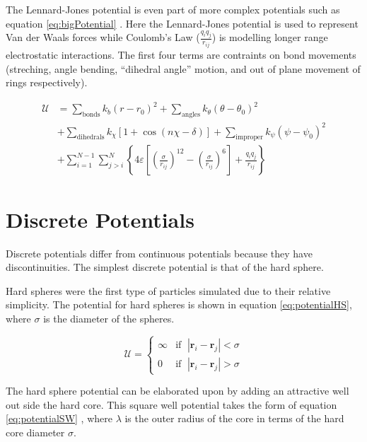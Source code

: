 \message{ !name(main.tex)}\documentclass[12pt]{UoAthesis}
\begin{document}
The Lennard-Jones potential is even part of more complex potentials
such as equation \eqref{eq:bigPotential} \cite{Maginn2010}.  Here the
Lennard-Jones potential is used to represent Van der Waals forces while
Coulomb's Law ($\frac{q_iq_j}{r_{ij}}$) is modelling longer range
electrostatic interactions.  The first four terms are contraints on
bond movements (streching, angle bending, ``dihedral angle'' motion,
and out of plane movement of rings respectively).

\begin{align}
  \label{eq:bigPotential}
  \mathcal{U} &= \sum_{\text{bonds}}k_b(r-r_0)^2 
  + \sum_{\text{angles}}k_\theta(\theta - \theta_0)^2 \nonumber\\
  &+ \sum_{\text{dihedrals}} k_\chi[1+\cos(n\chi - \delta)] 
  + \sum_{\text{improper}} k_\psi(\psi - \psi_0)^2 \nonumber\\
  &+ \sum_{i=1}^{N-1}\sum_{j>i}^{N}\left\{ 4 \varepsilon 
    \left[ \left( \frac{\sigma}{r_{ij}} \right)^{12}
      -\left( \frac{\sigma}{r_{ij}} \right)^{6} \right] 
    + \frac{q_iq_j}{r_{ij}}\right\}
\end{align}

\section{Discrete Potentials}

Discrete potentials differ from continuous potentials because they
have discontinuities.  The simplest discrete potential is that of the
hard sphere.

Hard spheres were the first type of particles simulated
\cite{Alder1957} due to their relative simplicity.  The potential for
hard spheres is shown in equation \eqref{eq:potentialHS}, where $\sigma$
is the diameter of the spheres.

\begin{equation}
  \label{eq:potentialHS}
  \mathcal{U} = 
  \begin{cases}
    \infty &\text{if }\; |\mathbf{r}_i - \mathbf{r}_j| < \sigma \\
    0 &\text{if }\; |\mathbf{r}_i - \mathbf{r}_j| > \sigma
  \end{cases}
\end{equation}

The hard sphere potential can be elaborated upon by adding an
attractive well out side the hard core.  This square well potential
takes the form of equation \eqref{eq:potentialSW} \cite{Barker1967},
where $\lambda$ is the outer radius of the core in terms of the hard
core diameter $\sigma$.
\end{document}
